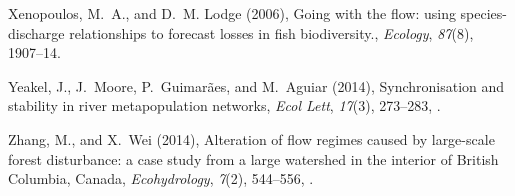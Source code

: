 \documentclass{AGUJournal}
\begin{document}
\begin{thebibliography}{38}
Xenopoulos, M.~A., and D.~M. Lodge (2006), Going with the flow: using
  species-discharge relationships to forecast losses in fish biodiversity.,
  \textit{Ecology}, \textit{87}(8), 1907--14.

Yeakel, J., J.~Moore, P.~Guimar{\~a}es, and M.~Aguiar (2014), Synchronisation
  and stability in river metapopulation networks, \textit{Ecol Lett},
  \textit{17}(3), 273--283, .

Zhang, M., and X.~Wei (2014), Alteration of flow regimes caused by
  large{-}scale forest disturbance: a case study from a large watershed in the
  interior of {British Columbia, Canada}, \textit{Ecohydrology}, \textit{7}(2),
  544--556, .

\end{thebibliography}




\listofchanges
\end{document}
